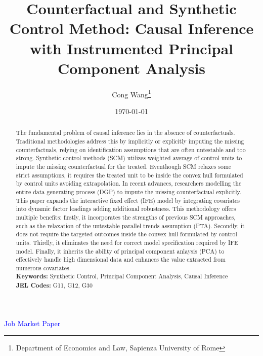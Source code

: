\documentclass[12pt]{article}
\begin{document}
\newtheorem{assumption}{Assumption}

\begin{titlepage}
\title{Counterfactual and Synthetic Control Method: Causal Inference with Instrumented Principal Component Analysis}
\author{ Cong Wang\thanks{Department of Economics and Law, Sapienza University of Rome}}
\date{\today}
\maketitle
\begin{center}
\textcolor{blue}{Job Market Paper}
\end{center}
\begin{abstract}
\noindent The fundamental problem of causal inference lies in the absence of counterfactuals. Traditional methodologies address this by implicitly or explicitly imputing the missing counterfactuals, relying on identification assumptions that are often untestable and too strong. Synthetic control methods (SCM) utilizes weighted average of control units to impute the missing counterfactual for the treated. Eventhough SCM relaxes some strict assumptions, it requires the treated unit to be inside the convex hull formulated by control units avoiding extrapolation. In recent advances, researchers modelling the entire data generating process (DGP) to impute the missing counterfactual explicitly. This paper expands the interactive fixed effect (IFE) model by integrating covariates into dynamic factor loadings adding additional robustness. This methodology offers multiple benefits: firstly, it incorporates the strengths of previous SCM approaches, such as the relaxation of the untestable parallel trends assumption (PTA). Secondly, it does not require the targeted outcomes inside the convex hull formulated by control units. Thirdly, it eliminates the need for correct model specification required by IFE model. Finally, it inherits the ability of principal component anlaysis (PCA) to effectively handle high dimensional data and enhances the value extracted from numerous covariates.\\

\noindent\textbf{Keywords:} Synthetic Control, Principal Component Analysis, Causal Inference\\

\noindent\textbf{JEL Codes:} G11, G12, G30\\
\bigskip
\end{abstract}
\setcounter{page}{0}
\thispagestyle{empty}
\end{titlepage}
\pagebreak \newpage
\end{document}
